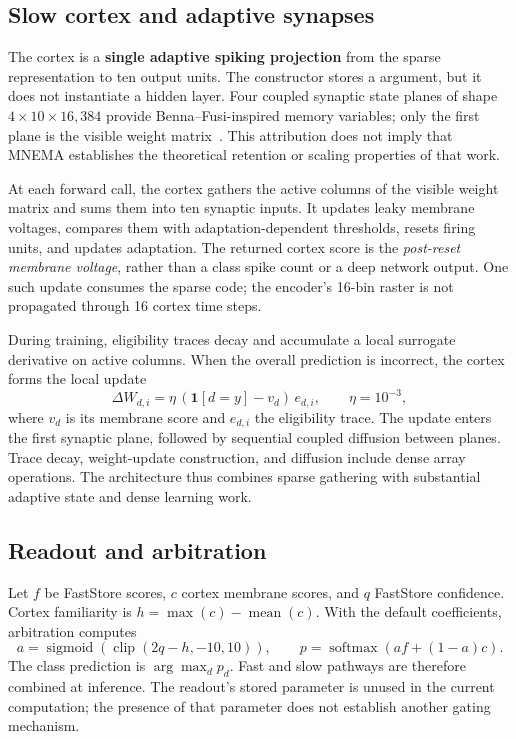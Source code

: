 \documentclass[10pt,a4paper]{article}
\newcommand{\code}[1]{\texttt{\detokenize{#1}}}
\begin{document}
\subsection{Slow cortex and adaptive synapses}
The cortex is a \textbf{single adaptive spiking projection} from the sparse
representation to ten output units. The constructor stores a
\code{hidden_dim=256} argument, but it does not instantiate a hidden layer.
Four coupled \code{float32} synaptic state planes of shape
$4\times10\times16{,}384$ provide Benna--Fusi-inspired memory variables; only
the first plane is the visible weight matrix~\citep{benna2016}.
This attribution does not imply that MNEMA establishes the theoretical
retention or scaling properties of that work.

At each forward call, the cortex gathers the active columns of the visible
weight matrix and sums them into ten synaptic inputs. It updates leaky membrane
voltages, compares them with adaptation-dependent thresholds, resets firing
units, and updates adaptation. The returned cortex score is the
\emph{post-reset membrane voltage}, rather than a class spike count or a deep
network output. One such update consumes the sparse code; the encoder's
16-bin raster is not propagated through 16 cortex time steps.

During training, eligibility traces decay and accumulate a local surrogate
derivative on active columns. When the overall prediction is incorrect, the
cortex forms the local update
\begin{equation}
  \Delta W_{d,i}=\eta\,(\mathbf{1}[d=y]-v_d)\,e_{d,i},
  \qquad \eta=10^{-3},
\end{equation}
where $v_d$ is its membrane score and $e_{d,i}$ the eligibility trace. The
update enters the first synaptic plane, followed by sequential coupled
diffusion between planes. Trace decay, weight-update construction, and
diffusion include dense array operations. The architecture thus combines
sparse gathering with substantial adaptive state and dense learning work.

\subsection{Readout and arbitration}
Let $f$ be FastStore scores, $c$ cortex membrane scores, and $q$ FastStore
confidence. Cortex familiarity is $h=\max(c)-\operatorname{mean}(c)$. With
the default coefficients, arbitration computes
\begin{equation}
 a=\operatorname{sigmoid}\!\left(\operatorname{clip}(2q-h,-10,10)\right),
 \qquad p=\operatorname{softmax}\!\left(af+(1-a)c\right).
\end{equation}
The class prediction is $\arg\max_d p_d$. Fast and slow pathways are therefore
combined at inference. The readout's stored \code{a2} parameter is unused in
the current computation; the presence of that parameter does not establish
another gating mechanism.
\end{document}

